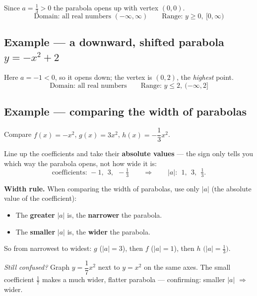 \documentclass[11pt]{article}
\begin{document}
Since $a=\tfrac13>0$ the parabola opens up with vertex $(0,0)$.
\[
\boxed{\text{Domain: all real numbers } (-\infty,\infty)} \qquad
\boxed{\text{Range: } y \ge 0,\ [0,\infty)}
\]

\subsection{Example --- a downward, shifted parabola $y = -x^2 + 2$}

Here $a=-1<0$, so it opens down; the vertex is $(0,2)$, the \emph{highest} point.
\[
\boxed{\text{Domain: all real numbers}} \qquad
\boxed{\text{Range: } y \le 2,\ (-\infty,2]}
\]

\subsection{Example --- comparing the width of parabolas}

Compare $f(x) = -x^2$, \quad $g(x) = 3x^2$, \quad $h(x) = -\dfrac{1}{3}x^2$.

Line up the coefficients and take their \textbf{absolute values} --- the sign only tells you
which way the parabola opens, not how wide it is:
\[
\text{coefficients: } -1,\ \ 3,\ \ -\tfrac13
\qquad\Longrightarrow\qquad
|a|:\ \ 1,\ \ 3,\ \ \tfrac13 .
\]

\begin{keybox}
\textbf{Width rule.} When comparing the width of parabolas, use only $|a|$ (the absolute value
of the coefficient):
\begin{itemize}[nosep,leftmargin=1.4em]
\item The \textbf{greater} $|a|$ is, the \textbf{narrower} the parabola.
\item The \textbf{smaller} $|a|$ is, the \textbf{wider} the parabola.
\end{itemize}
\end{keybox}

So from narrowest to widest: $g$ ($|a|=3$), then $f$ ($|a|=1$), then $h$ $\big(|a|=\tfrac13\big)$.

\textit{Still confused?} Graph $y=\dfrac{1}{7}x^2$ next to $y=x^2$ on the same axes. The small
coefficient $\tfrac17$ makes a much wider, flatter parabola --- confirming: smaller $|a|$
$\Rightarrow$ wider.

\begin{center}
\end{center}
\end{document}
